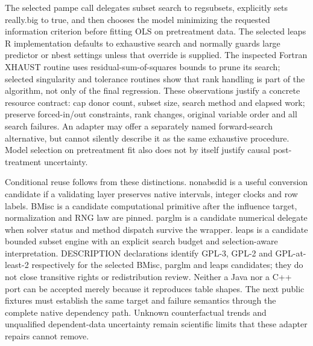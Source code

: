 The selected pampe call delegates subset search to regsubsets, explicitly sets really.big to true, and then chooses the model minimizing the requested information criterion before fitting OLS on pretreatment data. The selected leaps R implementation defaults to exhaustive search and normally guards large predictor or nbest settings unless that override is supplied. The inspected Fortran XHAUST routine uses residual-sum-of-squares bounds to prune its search; selected singularity and tolerance routines show that rank handling is part of the algorithm, not only of the final regression. These observations justify a concrete resource contract: cap donor count, subset size, search method and elapsed work; preserve forced-in/out constraints, rank changes, original variable order and all search failures. An adapter may offer a separately named forward-search alternative, but cannot silently describe it as the same exhaustive procedure. Model selection on pretreatment fit also does not by itself justify causal post-treatment uncertainty.~\citep{exec28_panel_delegates,exec29_panel_inference_sources}

Conditional reuse follows from these distinctions. nonabsdid is a useful conversion candidate if a validating layer preserves native intervals, integer clocks and row labels. BMisc is a candidate computational primitive after the influence target, normalization and RNG law are pinned. parglm is a candidate numerical delegate when solver status and method dispatch survive the wrapper. leaps is a candidate bounded subset engine with an explicit search budget and selection-aware interpretation. DESCRIPTION declarations identify GPL-3, GPL-2 and GPL-at-least-2 respectively for the selected BMisc, parglm and leaps candidates; they do not close transitive rights or redistribution review. Neither a Java nor a C++ port can be accepted merely because it reproduces table shapes. The next public fixtures must establish the same target and failure semantics through the complete native dependency path. Unknown counterfactual trends and unqualified dependent-data uncertainty remain scientific limits that these adapter repairs cannot remove.~\citep{exec29_panel_inference_sources}
